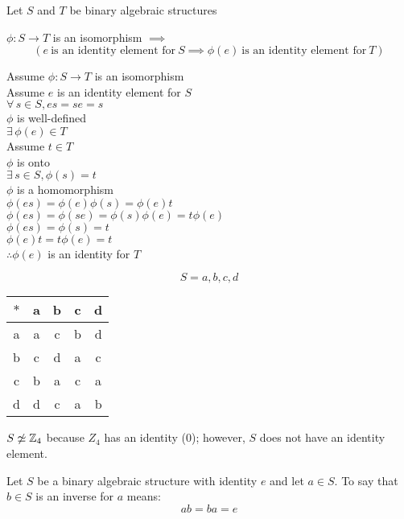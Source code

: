 \documentclass[letterpaper,12pt,fleqn]{article}
\newcommand{\p}{\phi}
\begin{document}
\begin{theorem}
  Let $S$ and $T$ be binary algebraic structures
  
  $\p:S\to T$ is an isomorphism $\implies$
  \[\left(e\ \mbox{is an identity element for}\ S\implies
  \p(e)\ \mbox{is an identity element for}\ T\right)\]
\end{theorem}
\newpage
\begin{theproof}
  Assume $\p:S\to T$ is an isomorphism \\
  Assume $e$ is an identity element for $S$ \\
  $\forall\,s\in S,es=se=s$ \\
  $\p$ is well-defined \\
  $\exists\,\p(e)\in T$ \\
  Assume $t\in T$ \\
  $\p$ is onto \\
  $\exists\,s\in S,\p(s)=t$ \\
  $\p$ is a homomorphism \\
  $\p(es)=\p(e)\p(s)=\p(e)t$ \\
  $\p(es)=\p(se)=\p(s)\p(e)=t\p(e)$ \\
  $\p(es)=\p(s)=t$ \\
  $\p(e)t=t\p(e)=t$ \\
  $\therefore \p(e)$ is an identity for $T$
\end{theproof}

\begin{example}
  \[S={a,b,c,d}\]

  \begin{tabular}{c|cccc}
    $*$ & a & b & c & d \\
    \hline
    a & a & c & b & d \\
    b & c & d & a & c \\
    c & b & a & c & a \\
    d & d & c & a & b \\
  \end{tabular}

  \bigskip

  $S\not\simeq \mathbb{Z}_4$ because $Z_4$ has an identity (0); however, $S$ does not
  have an identity element.
\end{example}

\begin{definition}
  Let $S$ be a binary algebraic structure with identity $e$ and let $a\in S$.
  To say that $b\in S$ is an inverse for $a$ means:
  \[ab=ba=e\]
\end{definition}
\end{document}
